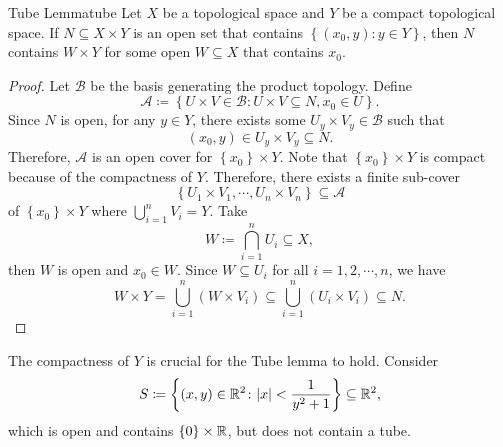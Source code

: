 \documentclass[math]{amznotes}
\theoremstyle{remark}
\begin{document}
\begin{lembox}{Tube Lemma}{tube}
    Let $X$ be a topological space and $Y$ be a compact topological space. If $N \subseteq X \times Y$ is an open set that contains $\left\{\left(x_0, y\right) \colon y \in Y \right\}$, then $N$ contains $W \times Y$ for some open $W \subseteq X$ that contains $x_0$.
    \tcblower
    \begin{proof}
        Let $\mathcal{B}$ be the basis generating the product topology. Define 
        \begin{equation*}
            \mathcal{A} \coloneqq \left\{U \times V \in \mathcal{B} \colon U \times V \subseteq N, x_0 \in U\right\}.
        \end{equation*}
        Since $N$ is open, for any $y \in Y$, there exists some $U_y \times V_y \in \mathcal{B}$ such that 
        \begin{equation*}
            \left(x_0, y\right) \in U_y \times V_y \subseteq N.
        \end{equation*}
        Therefore, $\mathcal{A}$ is an open cover for $\left\{x_0\right\} \times Y$. Note that $\left\{x_0\right\} \times Y$ is compact because of the compactness of $Y$. Therefore, there exists a finite sub-cover
        \begin{equation*}
            \left\{U_1 \times V_1, \cdots, U_n \times V_n\right\} \subseteq \mathcal{A}
        \end{equation*}
        of $\left\{x_0\right\} \times Y$ where $\bigcup_{i = 1}^nV_i = Y$. Take 
        \begin{equation*}
            W \coloneqq \bigcap_{i = 1}^nU_i \subseteq X,
        \end{equation*}
        then $W$ is open and $x_0 \in W$. Since $W \subseteq U_i$ for all $i = 1, 2, \cdots, n$, we have 
        \begin{equation*}
            W \times Y = \bigcup_{i = 1}^n\left(W \times V_i\right) \subseteq \bigcup_{i = 1}^n\left(U_i \times V_i\right) \subseteq N.
        \end{equation*}
    \end{proof}
\end{lembox}
The compactness of $Y$ is crucial for the Tube lemma to hold. Consider 
\begin{equation*}
    S \coloneqq \left\{\left(x, y\right) \in \mathbb{R}^2 \colon {\left\lvert {x} \right\rvert} < \frac{1}{y^2 + 1}\right\} \subseteq \mathbb{R}^2,
\end{equation*}
which is open and contains $\left\{0\right\} \times \mathbb{R}$, but does not contain a tube.
\end{document}
